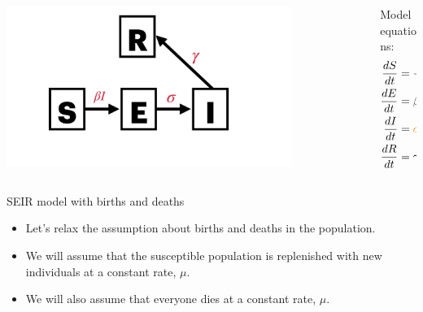 \documentclass[
  ignorenonframetext,
]{beamer}
\begin{document}
\begin{frame}
\begin{columns}[T]
\begin{column}{0.6\textwidth}
\includegraphics[width=0.8\textwidth,height=\textheight]{images/model_diagrams/model_diagrams.008.jpeg}
\end{column}

\begin{column}{0.4\textwidth}
Model equations: \begin{align}
\frac{dS}{dt} & = -\beta S I \\
\frac{dE}{dt} & = \beta S I - \color{orange}{\sigma E} \\
\frac{dI}{dt} & = \color{orange}{\sigma E} - \gamma I \\
\frac{dR}{dt} & = \gamma I
\end{align}
\end{column}
\end{columns}
\end{frame}

\begin{frame}
\begin{block}{SEIR model with births and deaths}
\label{seir-model-with-births-and-deaths}
\begin{itemize}
\item
  Let's relax the assumption about births and deaths in the population.
\item
  We will assume that the susceptible population is replenished with new
  individuals at a constant rate, \(\mu\).
\item
  We will also assume that everyone dies at a constant rate, \(\mu\).
\end{itemize}
\end{block}
\end{frame}
\end{document}

